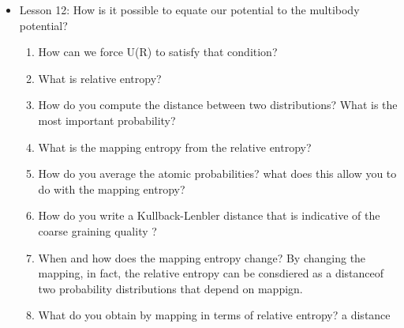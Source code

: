 {\begin{itemize}
\begin{enumerate}
        \item Is mapping invertible?
        \item What is the consistency condition?
        \item Obtain the potential energy that you get coarse-graining the system
        \item what is the multibody potential of mean force?
        \item When is your CG system ok? talking about the measured potential energy
        \item What is transferability? In the context of coarse-graining in molecular simulations or modeling, "transferability" refers to the ability of a coarse-grained model or representation to accurately capture and reproduce relevant properties of the system being studied. Transferability implies that the parameters and interactions used in the coarse-grained model, which are often derived from a more detailed or atomistic representation, are applicable and meaningful across different conditions or environments.
        \item wht is the multibody potential mean force?
        \item How do you allow the consistency condition for the momenta?
    \end{enumerate}
    \item Lesson 12: How is it possible to equate our potential to the multibody potential?
    \begin{enumerate}
        \item How can we force U(R) to satisfy that condition?
        \item What is relative entropy?
        \item How do you compute the distance between two distributions? What is the most important probability?
        \item What is the mapping entropy from the relative entropy?
        \item How do you average the atomic probabilities? what does this allow you to do with the mapping entropy?
        \item How do you write a Kullback-Lenbler distance that is indicative of the coarse graining quality ?
        \item When and how does the mapping entropy change? By changing the mapping, in fact, the relative entropy can be consdiered as a distanceof two probability distributions that depend on mappign.
        \item What do you obtain by mapping in terms of relative entropy? a distance

\end{enumerate}
\end{itemize}}

